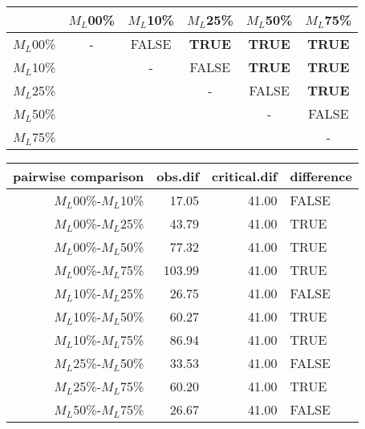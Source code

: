 \begin{tabular}{c|ccccc}
    \hline
              & $M_L$00\% & $M_L$10\% & $M_L$25\% & $M_L$50\% & $M_L$75\% \\
    \hline
    $M_L$00\% & - & FALSE & \textbf{TRUE} & \textbf{TRUE} & \textbf{TRUE}\\
    $M_L$10\% & & - & FALSE & \textbf{TRUE} & \textbf{TRUE} \\
    $M_L$25\% & & & - & FALSE & \textbf{TRUE} \\
    $M_L$50\% & & & & - & FALSE \\
    $M_L$75\% & & & & & - \\
    \hline
\end{tabular}
\centering
\begin{tabular}{rrrl}
 pairwise comparison & obs.dif & critical.dif & difference \\ 
  \hline
  $M_L$00\%-$M_L$10\% & 17.05 & 41.00 & FALSE \\ 
  $M_L$00\%-$M_L$25\% & 43.79 & 41.00 & TRUE \\ 
  $M_L$00\%-$M_L$50\% & 77.32 & 41.00 & TRUE \\ 
  $M_L$00\%-$M_L$75\% & 103.99 & 41.00 & TRUE \\ 
  $M_L$10\%-$M_L$25\% & 26.75 & 41.00 & FALSE \\ 
  $M_L$10\%-$M_L$50\% & 60.27 & 41.00 & TRUE \\ 
  $M_L$10\%-$M_L$75\% & 86.94 & 41.00 & TRUE \\ 
  $M_L$25\%-$M_L$50\% & 33.53 & 41.00 & FALSE \\ 
  $M_L$25\%-$M_L$75\% & 60.20 & 41.00 & TRUE \\ 
  $M_L$50\%-$M_L$75\% & 26.67 & 41.00 & FALSE \\ 
   \hline
\end{tabular}